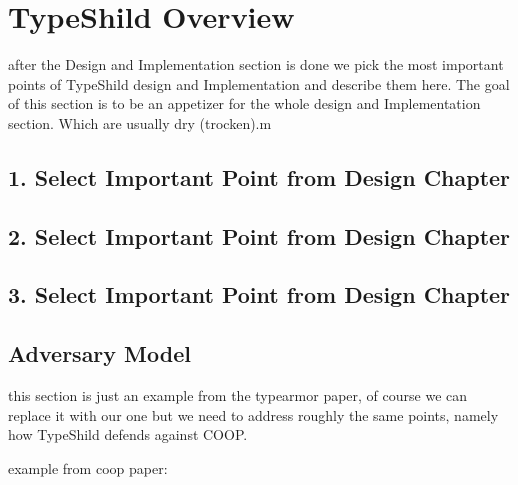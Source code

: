 \chapter{TypeShild Overview}
\label{chapter:TypeShild Overview}

after the Design and Implementation section is done
we pick the most important points of TypeShild design and Implementation and describe them here.
The goal of this section is to be an appetizer for the whole design and Implementation section.
Which are usually dry (trocken).m

\section{1. Select Important Point from Design Chapter}
\section{2. Select Important Point from Design Chapter}
\section{3. Select Important Point from Design Chapter}

\section{Adversary Model}
\label{Adversary Model}
this section is just an example from the typearmor paper, of course we can 
replace it with our one but we need to address roughly the same points, namely
how TypeShild defends against COOP.

example from coop paper:

